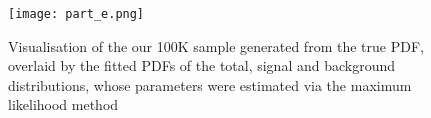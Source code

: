 \documentclass{article}
\begin{document}
\begin{figure}[h]
\centering
\texttt{[image: part\_e.png]}
\caption{Visualisation of the our 100K sample generated from the true PDF, overlaid by the fitted PDFs of the total, signal and background distributions, whose parameters were estimated via the maximum likelihood method}
\label{fig:e}
\end{figure}

\begin{comment}

\section*{Section B}

\subsection*{Introduction}

In section B we consider the theory, implementation and results of part (f) and (g). The goal of part (f) was to estimate the size of a dataset sampled from a 'signal plus background' model, which would lead to a 'discovery' of the signal at least 90\% of the time when we perform a hypothesis test on it. Similarly, the goal of part (g) was to estimate the size of a dataset sampled from a 'two signals plus background' model, which is needed to discover the two distinct signals at least 90\% of the time. For each part, we investigated 50 dataset sizes in an appropriate range found by trial and error. For each dataset size we repeated the following procedure $n$ times: generate a dataset, fit the null ($H_0$) and alternate ($H_1$) hypothesis distributions using maximum likelihood estimation, and perform a Neyman-Pearson hypothesis test. The number of discoveries for each dataset size is binomially distributed, which allows us to estimate the probability of discovery and uncertainty on this estimate from our experiment. We then fit a third order polynomial to approximate the relationship between $p$ and $N$ in the range of interest. This allows us to predict the critical dataset sizes, as well as their uncertainties using a Monte Carlo simulation.  

\subsection*{Methodology}

\subsubsection*{Neyman-Pearson Test}


\end{comment}
\end{document}

